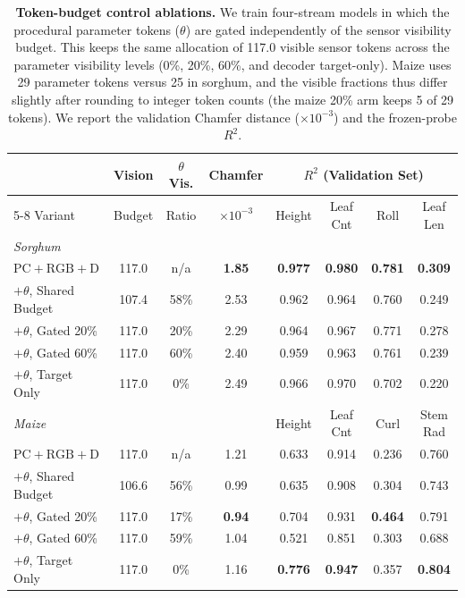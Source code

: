 \documentclass[10pt,twocolumn,letterpaper]{article}
\begin{document}
\begin{table}[t]
  \caption{\textbf{Token-budget control ablations.} We train four-stream models in which the procedural parameter tokens ($\theta$) are gated independently of the sensor visibility budget. This keeps the same allocation of 117.0 visible sensor tokens across the parameter visibility levels (0\%, 20\%, 60\%, and decoder target-only). Maize uses 29 parameter tokens versus 25 in sorghum, and the visible fractions thus differ slightly after rounding to integer token counts (the maize 20\% arm keeps 5 of 29 tokens). We report the validation Chamfer distance ($\times 10^{-3}$) and the frozen-probe $R^2$.}
  \label{tab:control}\label{tab:token_budget}
  \centering\scriptsize
  \setlength{\tabcolsep}{3.2pt}
  \begin{tabular}{l cc c cccc}
    \toprule
    & Vision & $\theta$ Vis. & Chamfer & \multicolumn{4}{c}{$R^2$ (Validation Set)} \\
    \cmidrule(lr){5-8}
    Variant & Budget & Ratio & $\times10^{-3}$ & Height & Leaf Cnt & Roll & Leaf Len \\
    \midrule
    \multicolumn{8}{l}{\emph{Sorghum}} \\
    $\mathrm{PC}+\mathrm{RGB}+\mathrm{D}$ & 117.0 & n/a& \textbf{1.85} & \textbf{0.977} & \textbf{0.980} & \textbf{0.781} & \textbf{0.309} \\
    $+\theta$, Shared Budget & 107.4 & 58\% & 2.53 & 0.962 & 0.964 & 0.760 & 0.249 \\
    $+\theta$, Gated 20\% & 117.0 & 20\% & 2.29 & 0.964 & 0.967 & 0.771 & 0.278 \\
    $+\theta$, Gated 60\% & 117.0 & 60\% & 2.40 & 0.959 & 0.963 & 0.761 & 0.239 \\
    $+\theta$, Target Only & 117.0 & 0\% & 2.49 & 0.966 & 0.970 & 0.702 & 0.220 \\
    \midrule
    \multicolumn{4}{l}{\emph{Maize}} & Height & Leaf Cnt & Curl & Stem Rad \\
    $\mathrm{PC}+\mathrm{RGB}+\mathrm{D}$ & 117.0 & n/a& 1.21 & 0.633 & 0.914 & 0.236 & 0.760 \\
    $+\theta$, Shared Budget & 106.6 & 56\% & 0.99 & 0.635 & 0.908 & 0.304 & 0.743 \\
    $+\theta$, Gated 20\% & 117.0 & 17\% & \textbf{0.94} & 0.704 & 0.931 & \textbf{0.464} & 0.791 \\
    $+\theta$, Gated 60\% & 117.0 & 59\% & 1.04 & 0.521 & 0.851 & 0.303 & 0.688 \\
    $+\theta$, Target Only & 117.0 & 0\% & 1.16 & \textbf{0.776} & \textbf{0.947} & 0.357 & \textbf{0.804} \\
    \bottomrule
  \end{tabular}
\end{table}
\end{document}
